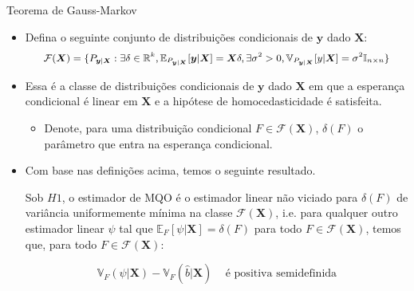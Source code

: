 \documentclass[11pt]{beamer}
\begin{document}
\begin{frame}{Teorema de Gauss-Markov}
	\begin{itemize}
		\item Defina o seguinte conjunto de distribuições condicionais de $\boldsymbol{y}$ dado $\boldsymbol{X}$:
		$$\small \mathcal{F}(\boldsymbol{X}) = \{P_{\boldsymbol{y}|\boldsymbol{X}}: \exists \delta \in \mathbb{R}^k,  \mathbb{E}_{P_{\boldsymbol{y}|\boldsymbol{X}}} [\boldsymbol{y}|\boldsymbol{X}] = \boldsymbol{X}\delta, \exists \sigma^2 > 0, \mathbb{V}_{P_{\boldsymbol{y}|\boldsymbol{X}}}[ y|\boldsymbol{X}] = \sigma^2 \mathbb{I}_{n\times n}\}$$
		\item Essa é a classe de distribuições condicionais de $\boldsymbol{y}$ dado $\boldsymbol{X}$ em que a esperança condicional é linear em $\boldsymbol{X}$ e a hipótese de homocedasticidade é satisfeita.
		\begin{itemize}
			\item Denote, para uma distribuição condicional $F \in \mathcal{F}(\boldsymbol{X}) $, $\delta(F)$ o parâmetro que entra na esperança condicional.
		\end{itemize}
		\item Com base nas definições acima, temos o seguinte resultado.
		\begin{theorem}
		 Sob $H1$, o estimador de MQO é o estimador {\color{red}linear} não viciado para $\delta(F)$ de variância uniformemente mínima na classe $\mathcal{F}(\boldsymbol{X})$, i.e. para qualquer outro estimador  {\color{red}linear} $\psi$ tal que $\mathbb{E}_{F}[\psi|\boldsymbol{X}] = \delta(F)$ para todo $F \in \mathcal{F}(\boldsymbol{X})$, temos que, para todo $F \in \mathcal{F}(\boldsymbol{X})$:
			
			$$\mathbb{V}_{F}(\psi|\boldsymbol{X}) - \mathbb{V}_{F}(\hat{b}|\boldsymbol{X})\, \quad \text{é positiva semidefinida} $$
		\end{theorem}
	\end{itemize}
\end{frame}
\end{document}
